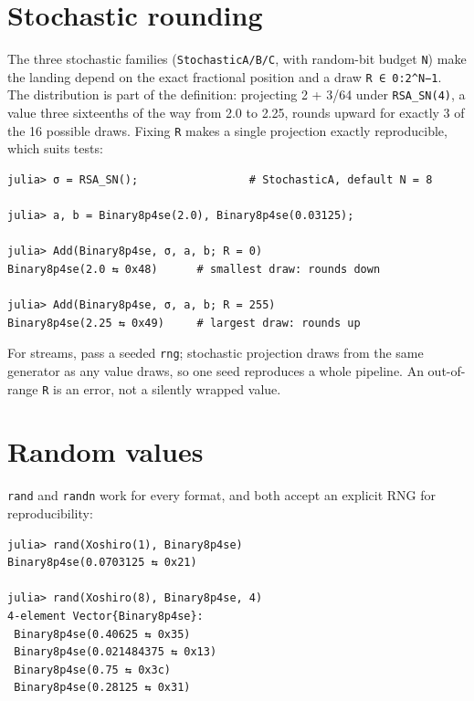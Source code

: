 \section{Stochastic rounding}



\label{5064376698567748197}{}


The three stochastic families (\texttt{StochasticA/B/C}, with random-bit budget \texttt{N}) make the landing depend on the exact fractional position and a draw \texttt{R ∈ 0:2{\textasciicircum}N−1}. The distribution is part of the definition: projecting 2 + 3/64 under \texttt{RSA\_\allowbreak{}SN(4)}, a value three sixteenths of the way from 2.0 to 2.25, rounds upward for exactly 3 of the 16 possible draws. Fixing \texttt{R} makes a single projection exactly reproducible, which suits tests:




\nopagebreak[4]
\begin{verbatim}
julia> σ = RSA_SN();                 # StochasticA, default N = 8

julia> a, b = Binary8p4se(2.0), Binary8p4se(0.03125);

julia> Add(Binary8p4se, σ, a, b; R = 0)
Binary8p4se(2.0 ⇆ 0x48)      # smallest draw: rounds down

julia> Add(Binary8p4se, σ, a, b; R = 255)
Binary8p4se(2.25 ⇆ 0x49)     # largest draw: rounds up
\end{verbatim}



For streams, pass a seeded \texttt{rng}; stochastic projection draws from the same generator as any value draws, so one seed reproduces a whole pipeline. An out-of-range \texttt{R} is an error, not a silently wrapped value.



\section{Random values}



\label{13027969696381432085}{}


\texttt{rand} and \texttt{randn} work for every format, and both accept an explicit RNG for reproducibility:




\nopagebreak[4]
\begin{verbatim}
julia> rand(Xoshiro(1), Binary8p4se)
Binary8p4se(0.0703125 ⇆ 0x21)

julia> rand(Xoshiro(8), Binary8p4se, 4)
4-element Vector{Binary8p4se}:
 Binary8p4se(0.40625 ⇆ 0x35)
 Binary8p4se(0.021484375 ⇆ 0x13)
 Binary8p4se(0.75 ⇆ 0x3c)
 Binary8p4se(0.28125 ⇆ 0x31)
\end{verbatim}



